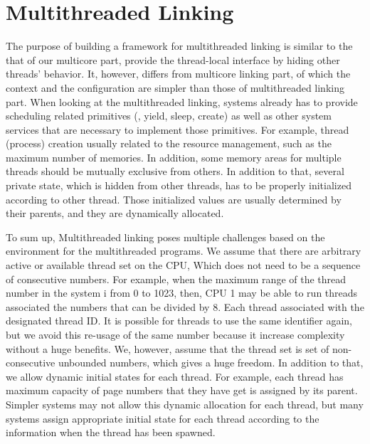 \section{Multithreaded Linking}
\label{chapter:linking:sec:multithreaded-linking}


The purpose of building a framework for multithreaded linking is similar to 
the that of our multicore part,
provide the thread-local interface 
by hiding other threads' behavior. 
It, however, differs from multicore linking part, of which the  context and the configuration 
are simpler than those of multithreaded linking part. 
When looking at the multithreaded linking, 
systems already has to provide 
scheduling related primitives (\ie, yield, sleep, create)
as well as other system services 
that are necessary to implement those primitives. 
For example, 
thread (process) creation usually related to the 
resource management,
such as the maximum number of memories.
In addition, 
some memory areas for multiple threads should be 
mutually exclusive from others. 
In addition to that, 
several private state,
which is hidden from other threads,
has to be properly initialized 
according to other thread.
Those initialized values
 are usually determined by their parents, 
 and they are dynamically allocated.

To sum up, 
Multithreaded linking poses 
multiple challenges based on the environment for the multithreaded programs.
We assume that 
there are arbitrary active or available thread set on the CPU, 
Which does not need to be a sequence of consecutive numbers.
For example, when the maximum range of
the thread number in the system i from 0 to 1023, 
then, CPU 1 may be able to run threads associated the numbers that can be divided by 8. 
Each thread associated with the 
designated thread ID. 
It is possible for threads to use the same identifier again, but 
we avoid this re-usage of the same number because it increase complexity without a huge benefits. 
We, however, assume that the thread set is set of non-consecutive unbounded numbers,
which gives a huge freedom. 
In addition to that, 
we allow dynamic initial states for each thread. 
For example, each thread has maximum capacity of page numbers that they have get is 
assigned by its parent. 
Simpler systems may not allow this dynamic allocation for each thread,
but many systems assign appropriate initial state for each thread 
according to the information when the thread has been spawned.


